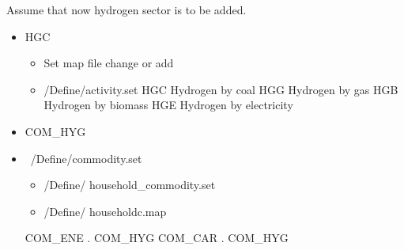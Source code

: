 \documentclass[10pt,a4paper,titlepage,dvipdfmx]{book}
\begin{document}
Assume that now hydrogen sector is to be added.
\begin{itemize}
\item HGC
\begin{itemize}
\item Set map file change or add

\item /Define/activity.set
      HGC Hydrogen by coal
      HGG Hydrogen by gas
      HGB Hydrogen by biomass
      HGE Hydrogen by electricity
\end{itemize}

\item COM\_HYG
\item ~/Define/commodity.set
\begin{itemize}
\item /Define/ household\_commodity.set
\item /Define/ householdc.map
\end{itemize}
COM\_ENE . COM\_HYG
COM\_CAR . COM\_HYG
\end{itemize}
\end{document}

